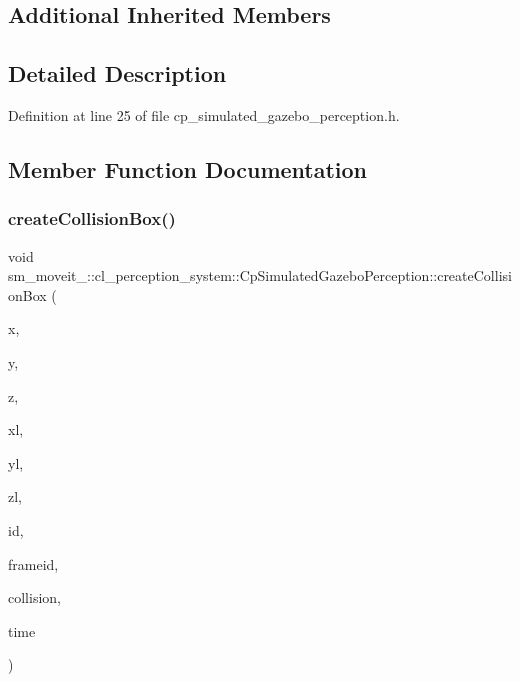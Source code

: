 \subsection*{Additional Inherited Members}


\subsection{Detailed Description}


Definition at line 25 of file cp\+\_\+simulated\+\_\+gazebo\+\_\+perception.\+h.



\subsection{Member Function Documentation}
\mbox{\label{classsm__moveit__4_1_1cl__perception__system_1_1CpSimulatedGazeboPerception_aae9d3b564d1442453dac71a2d9fe89fe}} 
\subsubsection{\texorpdfstring{create\+Collision\+Box()}{createCollisionBox()}}
{\footnotesize\ttfamily void sm\+\_\+moveit\+\_\+::cl\+\_\+perception\+\_\+system\+::\+Cp\+Simulated\+Gazebo\+Perception\+::create\+Collision\+Box (\begin{DoxyParamCaption}\item[{float}]{x,  }\item[{float}]{y,  }\item[{float}]{z,  }\item[{float}]{xl,  }\item[{float}]{yl,  }\item[{float}]{zl,  }\item[{std\+::string}]{id,  }\item[{std\+::string}]{frameid,  }\item[{moveit\+\_\+msgs\+::\+Collision\+Object \&}]{collision,  }\item[{ros\+::\+Time}]{time }\end{DoxyParamCaption})\hspace{0.3cm}{\ttfamily [inline]}}



